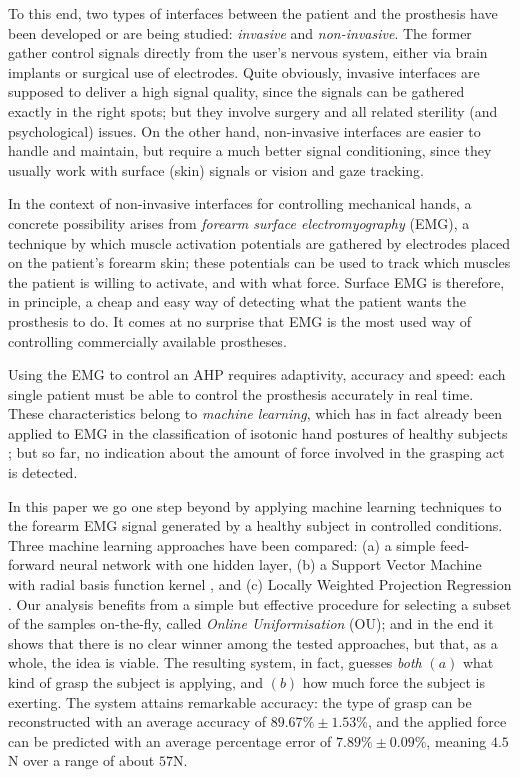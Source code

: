 To this end, two types of interfaces between the patient and the
prosthesis have been developed or are being studied: \emph{invasive}
and \emph{non-invasive}. The former gather control signals directly
from the user's nervous system, either via brain implants or surgical
use of electrodes. Quite obviously, invasive interfaces are supposed
to deliver a high signal quality, since the signals can be gathered
exactly in the right spots; but they involve surgery and all related
sterility (and psychological) issues. On the other hand, non-invasive
interfaces are easier to handle and maintain, but require a much
better signal conditioning, since they usually work with surface
(skin) signals or vision and gaze tracking.

In the context of non-invasive interfaces for controlling mechanical
hands, a concrete possibility arises from \emph{forearm surface
electromyography} (EMG), a technique by which muscle
activation potentials are gathered by electrodes placed on the
patient's forearm skin; these potentials can be used to track which
muscles the patient is willing to activate, and with what force.
Surface EMG is therefore, in principle, a cheap and easy way of
detecting what the patient wants the prosthesis to do. It comes at no
surprise that EMG is the most used way of controlling commercially
available prostheses.

Using the EMG to control an AHP requires adaptivity, accuracy and
speed: each single patient must be able to control the prosthesis
accurately in real time. These characteristics belong to \emph{machine
learning}, which has in fact already been applied to EMG in the
classification of isotonic hand postures of healthy subjects
\cite{ekvall,smagt}; but so far, no indication about the amount of
force involved in the grasping act is detected.

In this paper we go one step beyond by applying machine learning
techniques to the forearm EMG signal generated by a healthy subject in
controlled conditions. Three machine learning approaches have been compared:
(a) a simple feed-forward neural network with one hidden layer,
(b) a Support Vector Machine with radial basis function kernel
\cite{BGV92}, and (c) Locally Weighted Projection Regression
\cite{lwpr}. Our analysis benefits from a simple but effective procedure
for selecting a subset of the samples on-the-fly, called \emph{Online
Uniformisation} (OU); and in the end it shows that there is no clear
winner among the tested approaches, but that, as a whole, the idea is
viable. The resulting system, in fact, guesses \emph{both} $(a)$ what
kind of grasp the subject is applying, and $(b)$ how much force the
subject is exerting. The system attains remarkable accuracy: the type
of grasp can be reconstructed with an average accuracy of $89.67\% \pm
1.53\%$, and the applied force can be predicted with an average
percentage error of $7.89\% \pm 0.09\%$, meaning $4.5$N over a range
of about $57$N.

